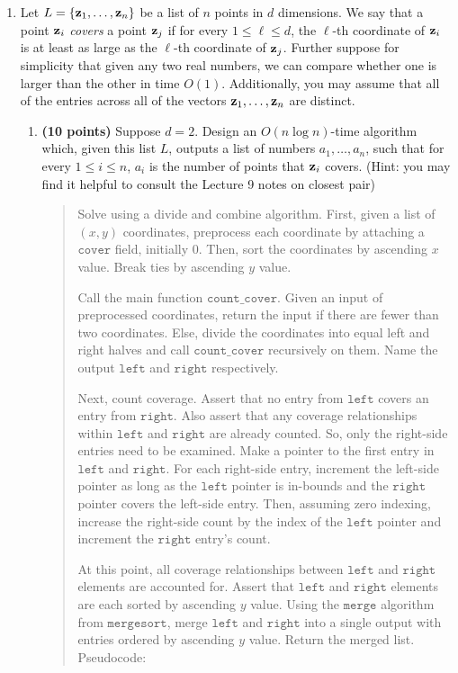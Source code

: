 \documentclass[11pt]{article}
\newcommand{\code}[1]{$\texttt{#1}$}
\begin{document}
\begin{enumerate}
\item Let $L = \{{\bf z}_1,\ldots,{\bf z}_n\}$ be a list of $n$ points in $d$ dimensions. We say that a point ${\bf z}_i$ \emph{covers} a point ${\bf z}_j$ if for every $1 \le \ell \le d$, the $\ell$-th coordinate of ${\bf z}_i$ is at least as large as the $\ell$-th coordinate of ${\bf z}_j$. Further suppose for simplicity that given any two real numbers, we can compare whether one is larger than the other in time $O(1)$. Additionally, you may assume that all of the entries across all of the vectors ${\bf z}_1,\ldots,{\bf z}_n$ are distinct.
\begin{enumerate}
    \item {\bf (10 points)} Suppose $d = 2$. Design an $O(n \log n)$-time algorithm which, given this list $L$, outputs a list of numbers $a_1,\ldots,a_n$, such that for every $1\le i\le n$, $a_i$ is the number of points that ${\bf z}_i$ covers. (Hint: you may find it helpful to consult the Lecture 9 notes on closest pair)
  \begin{quote}
    \color{purple}
    Solve using a divide and combine algorithm. First, given a list of $(x, y)$ coordinates, preprocess each coordinate by attaching a \code{cover} field, initially $0$. Then, sort the coordinates by ascending $x$ value. Break ties by ascending $y$ value.

\medskip
Call the main function \code{count\_cover}. Given an input of preprocessed coordinates, return the input if there are fewer than two coordinates. Else, divide the coordinates into equal left and right halves and call \code{count\_cover} recursively on them. Name the output \code{left} and \code{right} respectively.

\medskip
Next, count coverage. Assert that no entry from \code{left} covers an entry from \code{right}. Also assert that any coverage relationships within \code{left} and \code{right} are already counted. So, only the right-side entries need to be examined. Make a pointer to the first entry in \code{left} and \code{right}. For each right-side entry, increment the left-side pointer as long as the \code{left} pointer is in-bounds and the \code{right} pointer covers the left-side entry. Then, assuming zero indexing, increase the right-side count by the index of the \code{left} pointer and increment the \code{right} entry's count.

\medskip
At this point, all coverage relationships between \code{left} and \code{right} elements are accounted for. Assert that \code{left} and \code{right} elements are each sorted by ascending $y$ value. Using the \code{merge} algorithm from \code{mergesort}, merge \code{left} and \code{right} into a single output with entries ordered by ascending $y$ value. Return the merged list. Pseudocode:


\end{quote}
\end{enumerate}
\end{enumerate}
\end{document}
